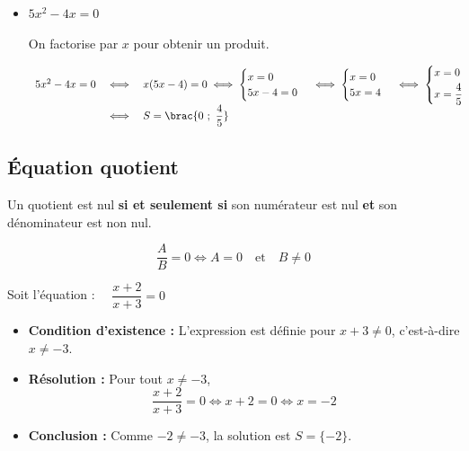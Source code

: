 \begin{methode}
\begin{correction}
\begin{itemize}
			\item $5x^2 - 4x = 0$

			      On factorise par $x$ pour obtenir un produit.

			      \[
				      \begin{array}{rcl}
					      5x^2 - 4x = 0 & \iff & x(5x - 4) = 0 \iff \begin{cases}
						                                                x = 0 \\
						                                                5x - 4 = 0
					                                                \end{cases} \iff \begin{cases}
						                                                                 x = 0 \\
						                                                                 5x = 4
					                                                                 \end{cases} \iff \begin{cases}
						                                                                                  x = 0 \\[1mm]
						                                                                                  x = \dfrac{4}{5}
					                                                                                  \end{cases} \\[3mm] %
					                    & \iff & S = \brac{0\ ;\ \dfrac{4}{5}}
				      \end{array}
			      \]
		\end{itemize}
	\end{correction}
\end{methode}

\subsection{Équation quotient}

\begin{prop}
	Un quotient est nul \textbf{si et seulement si} son numérateur est nul \textbf{et} son dénominateur est non nul.

	\[
		\dfrac{A}{B} = 0 \iff A = 0 \quad \text{et} \quad B \neq 0
	\]
\end{prop}

\begin{ex}
	Soit l'équation : $\quad\dfrac{x+2}{x+3} = 0$

	\begin{itemize}
		\item \textbf{Condition d'existence :} L'expression est définie pour $x + 3 \neq 0$, c'est-à-dire $x \neq -3$.
		\item \textbf{Résolution :} Pour tout $x \neq -3$,
		      \[
			      \dfrac{x+2}{x+3} = 0 \iff x + 2 = 0 \iff x = -2
		      \]
		\item \textbf{Conclusion :} Comme $-2 \neq -3$, la solution est $S = \{-2\}$.
	\end{itemize}
\end{ex}

